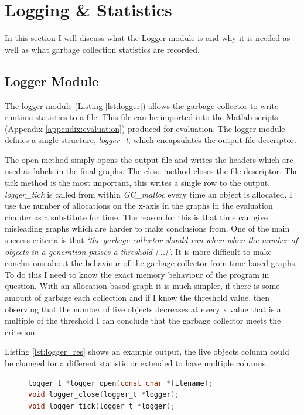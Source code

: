 \documentclass[../diss.tex]{subfiles}
\begin{document}
\section{Logging \& Statistics} \label{sec:logger}

In this section I will discuss what the Logger module is and why it is needed as well as what garbage collection statistics are recorded.

\subsection{Logger Module}

The logger module (Listing \ref{lst:logger}) allows the garbage collector to write runtime statistics to a file. This file can be imported into the Matlab scripts (Appendix \ref{appendix:evaluation}) produced for evaluation. The logger module defines a single structure, \emph{logger\_t}, which encapsulates the output file descriptor.

The open method simply opens the output file and writes the headers which are used as labels in the final graphs. The close method closes the file descriptor. The tick method is the most important, this writes a single row to the output. \emph{logger\_tick} is called from within \emph{GC\_malloc} every time an object is allocated. 
I use the number of allocations on the x-axis in the graphs in the evaluation chapter as a substitute for time. The reason for this is that time can give misleading graphs which are harder to make conclusions from. One of the main success criteria is that \emph{`the garbage collector should run when when the number of objects in a generation passes a threshold [...]'}. It is more difficult to make conclusions about the behaviour of the garbage collector from time-based graphs. To do this I need to know the exact memory behaviour of the program in question. With an allocation-based graph it is much simpler, if there is some amount of garbage each collection and if I know the threshold value, then observing that the number of live objects decreases at every x value that is a multiple of the threshold I can conclude that the garbage collector meets the criterion. 

Listing \ref{lst:logger_res} shows an example output, the live objects column could be changed for a different statistic or extended to have multiple columns.

\begin{figure}
\begin{lstlisting}[language=C, caption=Logger interface, label={lst:logger}]
logger_t *logger_open(const char *filename);
void logger_close(logger_t *logger);
void logger_tick(logger_t *logger);
\end{lstlisting}
\end{figure}
\end{document}
